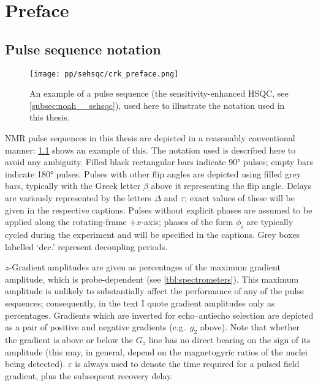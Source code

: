 \chapter{Preface}

\section*{Pulse sequence notation}

\begin{figure}[ht]
    \centering
    \texttt{[image: pp/sehsqc/crk\_preface.png]}
    \caption[Example pulse sequence to illustrate notation]{An example of a pulse sequence (the sensitivity-enhanced HSQC, see \cref{subsec:noah__sehsqc}), used here to illustrate the notation used in this thesis.}
    \label{fig:preface_sehsqc}
\end{figure}

NMR pulse sequences in this thesis are depicted in a reasonably conventional manner: \cref{fig:preface_sehsqc} shows an example of this.
The notation used is described here to avoid any ambiguity.
Filled black rectangular bars indicate \ang{90} pulses; empty bars indicate \ang{180} pulses.
Pulses with other flip angles are depicted using filled grey bars, typically with the Greek letter $\beta$ above it representing the flip angle.
Delays are variously represented by the letters $\Delta$ and $\tau$; exact values of these will be given in the respective captions.
Pulses without explicit phases are assumed to be applied along the rotating-frame $+x$-axis; phases of the form $\phi_i$ are typically cycled during the experiment and will be specified in the captions.
Grey boxes labelled `dec.' represent decoupling periods.

$z$-Gradient amplitudes are given as percentages of the maximum gradient amplitude, which is probe-dependent (see \cref{tbl:spectrometers}).
This maximum amplitude is unlikely to substantially affect the performance of any of the pulse sequences; consequently, in the text I quote gradient amplitudes only as percentages.
Gradients which are inverted for echo--antiecho selection are depicted as a pair of positive and negative gradients (e.g.\ $g_2$ above).
Note that whether the gradient is above or below the $G_z$ line has no direct bearing on the sign of its amplitude (this may, in general, depend on the magnetogyric ratios of the nuclei being detected).
$\varepsilon$ is always used to denote the time required for a pulsed field gradient, plus the subsequent recovery delay.

